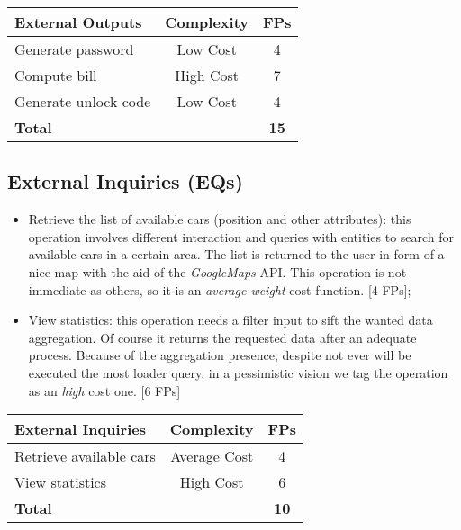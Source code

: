\documentclass{scrreprt}
\begin{document}
\begin{center}
\begin{tabular}{lcc}
\toprule \textbf{External Outputs}&\textbf{Complexity}&\textbf{FPs}\\ \midrule
Generate password & Low Cost & 4\\ 
Compute bill & High Cost & 7\\ 
Generate unlock code& Low Cost & 4\\ \midrule
\textbf{Total}&&\textbf{15}\\
\bottomrule
\end{tabular}
\end{center}

\subsection{External Inquiries (EQs)}

\begin{itemize}
\item Retrieve the list of available cars (position and other attributes): this operation involves different interaction and queries with entities to search for available cars in a certain area. The list is returned to the user in form of a nice map with the aid of the \emph{GoogleMaps} API.
This operation is not immediate as others, so it is an \emph{average-weight} cost function. [4 FPs];

\item View statistics: this operation needs a filter input to sift the wanted data aggregation. Of course it returns the requested data after an adequate process.
Because of the aggregation presence, despite not ever will be executed the most loader query, in a pessimistic vision we tag the operation as an \emph{high} cost one. [6 FPs]

\end{itemize}

\begin{center}
\begin{tabular}{lcc}
\toprule \textbf{External Inquiries}&\textbf{Complexity}&\textbf{FPs}\\ \toprule
Retrieve available cars & Average Cost & 4\\
View statistics & High Cost & 6\\ \midrule
\textbf{Total}&&\textbf{10}\\
\bottomrule
\end{tabular}
\end{center}
\end{document}
